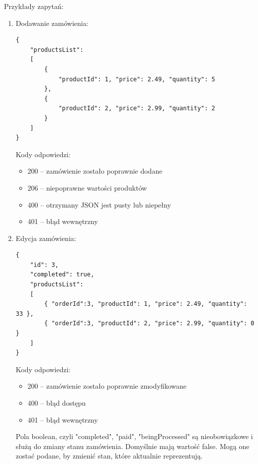 \documentclass[11pt,a4paper,twoside]{article}
\begin{document}

Przykłady zapytań:
\begin{enumerate}
\item Dodawanie zamówienia:
\begin{lstlisting}
{
    "productsList": 
    [
    	{ 
    		"productId": 1, "price": 2.49, "quantity": 5 
    	},
        {
            "productId": 2, "price": 2.99, "quantity": 2
        }           
    ]
}
\end{lstlisting}
\vspace{-20pt}
Kody odpowiedzi:
\begin{itemize}
\item 200 -- zamówienie zostało poprawnie dodane
\item 206 -- niepoprawne wartości produktów
\item 400 -- otrzymany JSON jest pusty lub niepełny
\item 401 -- błąd wewnętrzny
\end{itemize}

\item Edycja zamówienia:
\begin{lstlisting}
{
	"id": 3,
    "completed": true,
    "productsList": 
    [
    	{ "orderId":3, "productId": 1, "price": 2.49, "quantity": 33 },
        { "orderId":3, "productId": 2, "price": 2.99, "quantity": 0 }
    ]
}
\end{lstlisting}
\vspace{-20pt}
Kody odpowiedzi:
\begin{itemize}
\item 200 -- zamówienie zostało poprawnie zmodyfikowane
\item 400 -- błąd dostępu
\item 401 -- błąd wewnętrzny
\end{itemize}
Pola boolean, czyli "completed", "paid", "beingProcessed" są nieobowiązkowe i służą do zmiany stanu zamówienia. Domyślnie mają wartość false. Mogą one zostać podane, by zmienić stan, które aktualnie reprezentują.


\end{enumerate}
\end{document}
